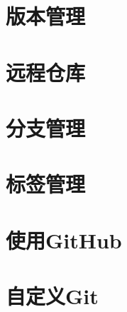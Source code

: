 \documentclass[•]{article}
\begin{document}
\begin{CJK}{UTF8}{gbsn}
\section{版本管理}
\section{远程仓库}
\section{分支管理}
\section{标签管理}
\section{使用GitHub}
\section{自定义Git}
\end{CJK}
\end{document}
